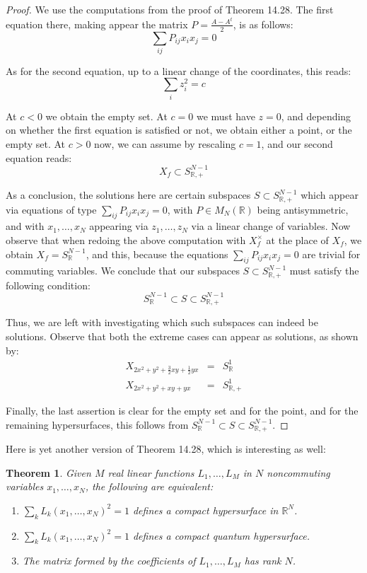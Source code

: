 \documentclass[12pt]{amsbook}
\newtheorem{theorem}{Theorem}[chapter]
\begin{document}
\begin{proof}
We use the computations from the proof of Theorem 14.28. The first equation there, making appear the matrix $P=\frac{A-A^t}{2}$, is as follows:
$$\sum_{ij}P_{ij}x_ix_j=0$$ 

As for the second equation, up to a linear change of the coordinates, this reads:
$$\sum_iz_i^2=c$$

At $c<0$ we obtain the empty set. At $c=0$ we must have $z=0$, and depending on whether the first equation is satisfied or not, we obtain either a point, or the empty set. At $c>0$ now, we can assume by rescaling $c=1$, and our second equation reads:
$$X_f\subset S^{N-1}_{\mathbb R,+}$$

As a conclusion, the solutions here are certain subspaces $S\subset S^{N-1}_{\mathbb R,+}$ which appear via equations of type $\sum_{ij}P_{ij}x_ix_j=0$, with $P\in M_N(\mathbb R)$ being antisymmetric, and with $x_1,\ldots,x_N$ appearing via $z_1,\ldots,z_N$ via a linear change of variables. Now observe that when redoing the above computation with $X_f^\times$ at the place of $X_f$, we obtain $X_f=S^{N-1}_\mathbb R$, and this, because the equations $\sum_{ij}P_{ij}x_ix_j=0$ are trivial for commuting variables. We conclude that our subspaces $S\subset S^{N-1}_{\mathbb R,+}$ must satisfy the following condition:
$$S^{N-1}_\mathbb R\subset S\subset S^{N-1}_{\mathbb R,+}$$

Thus, we are left with investigating which such subspaces can indeed be solutions. Observe that both the extreme cases can appear as solutions, as shown by:
\begin{eqnarray*}
X_{2x^2+y^2+\frac{3}{2}xy+\frac{1}{2}yx}&=&S^1_\mathbb R\\
X_{2x^2+y^2+xy+yx}&=&S^1_{\mathbb R,+}
\end{eqnarray*}

Finally, the last assertion is clear for the empty set and for the point, and for the remaining hypersurfaces, this follows from $S^{N-1}_\mathbb R\subset S\subset S^{N-1}_{\mathbb R,+}$.
\end{proof}

Here is yet another version of Theorem 14.28, which is interesting as well:


\begin{theorem}
Given $M$ real linear functions $L_1,\ldots,L_M$ in $N$ noncommuting variables $x_1,\ldots,x_N$, the following are equivalent:
\begin{enumerate}
\item $\sum_kL_k(x_1,\ldots,x_N)^2=1$ defines a compact hypersurface in $\mathbb R^N$.

\item $\sum_kL_k(x_1,\ldots,x_N)^2=1$ defines a compact quantum hypersurface.

\item The matrix formed by the coefficients of $L_1,\ldots,L_M$ has rank $N$.
\end{enumerate}
\end{theorem}
\end{document}
